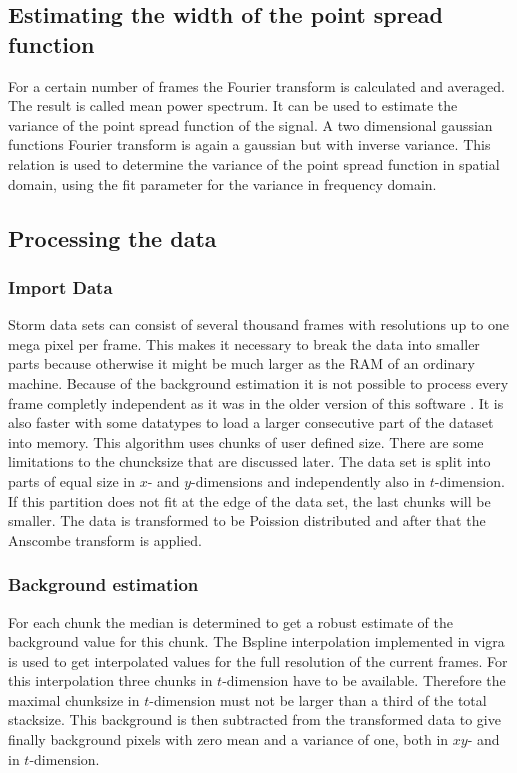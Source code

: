 \subsection{Estimating the width of the point spread function}
For a certain number of frames the Fourier transform is calculated and averaged. The result is called mean power spectrum. It can be used to estimate the variance of the point spread function of the signal. A two dimensional gaussian functions Fourier transform is again a gaussian but with inverse variance. This relation is used to determine the variance of the point spread function in spatial domain, using the fit parameter for the variance in frequency domain.
\subsection{Processing the data}
\subsubsection{Import Data}
Storm data sets can consist of several thousand frames with resolutions up to one mega pixel per frame. This makes it necessary to break the data into smaller parts because otherwise it might be much larger as the RAM of an ordinary machine. Because of the background estimation it is not possible to process every frame completly independent as it was in the older version of this software \cite{MAJoachim}. It is also faster with some datatypes to load a larger consecutive part of the dataset into memory.\newline
This algorithm uses chunks of user defined size. There are some limitations to the chuncksize that are discussed later. The data set is split into parts of equal size in $x$- and $y$-dimensions and independently also in $t$-dimension. If this partition does not fit at the edge of the data set, the last chunks will be smaller.\newline
The data is transformed to be Poission distributed and after that the Anscombe transform is applied.
\subsubsection{Background estimation}
For each chunk the median is determined to get a robust estimate of the background value for this chunk. 
The Bspline interpolation implemented in vigra \cite{vigra} is used to get interpolated values for the full resolution of the current frames. For this interpolation three chunks in $t$-dimension have to be available. Therefore the maximal chunksize in $t$-dimension must not be larger than a third of the total stacksize.\newline
This background is then subtracted from the transformed data to give finally background pixels with zero mean and a variance of one, both in $xy$- and in $t$-dimension.
